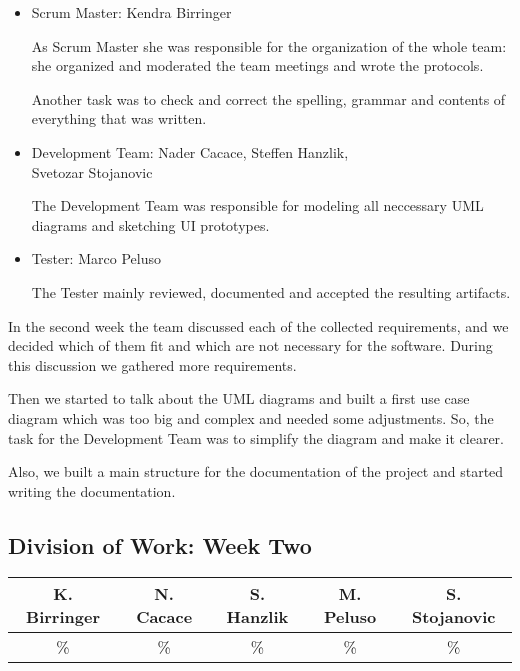 \documentclass[a4paper, 12pt]{article}
\begin{document}
\begin{itemize}
\item Scrum Master: Kendra Birringer

As Scrum Master she was responsible for the organization of the whole team: she organized and moderated the team meetings and wrote the protocols. 

Another task was to check and correct the spelling, grammar and contents of everything that was written.

\item Development Team: Nader Cacace, Steffen Hanzlik,\\
      Svetozar Stojanovic

The Development Team was responsible for modeling all neccessary UML diagrams and sketching UI prototypes.

\item Tester: Marco Peluso

The Tester mainly reviewed, documented and accepted the resulting artifacts.
\end{itemize}


In the second week the team discussed each of the collected requirements, and we decided which of them fit and which are not necessary for the software. During this discussion we gathered more requirements.

Then we started to talk about the UML diagrams and built a first use case diagram which was too big and complex and needed some adjustments. So, the task for the Development Team was to simplify the diagram and make it clearer.

Also, we built a main structure for the documentation of the project and started writing the documentation.

\newpage
\subsection{Division of Work: Week Two}

\begin{table}[h]
\centering
\setlength{\tabcolsep}{10pt}
\begin{tabular}{|c|c|c|c|c|}
\hline
K. Birringer & N. Cacace & S. Hanzlik & M. Peluso & S. Stojanovic\\
\hline
\% & \% & \% & \% & \% \\ 
\hline
\end{tabular}
\end{table}

\end{document}
